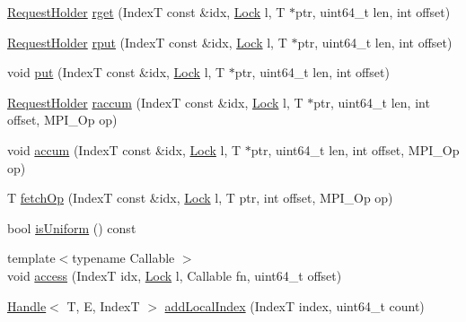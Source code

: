 \begin{DoxyCompactItemize}
\item 
\hyperlink{structvt_1_1rdma_1_1_request_holder}{Request\+Holder} \hyperlink{structvt_1_1rdma_1_1_sub_handle_a574e1878028cc096e008f815fd0b3db6}{rget} (IndexT const \&idx, \hyperlink{namespacevt_1_1rdma_ac5c20b41a653e520b6305d4d454ecb70}{Lock} l, T $\ast$ptr, uint64\+\_\+t len, int offset)
\item 
\hyperlink{structvt_1_1rdma_1_1_request_holder}{Request\+Holder} \hyperlink{structvt_1_1rdma_1_1_sub_handle_a6d0b89af8d8a7f68d7b5a44d724e4364}{rput} (IndexT const \&idx, \hyperlink{namespacevt_1_1rdma_ac5c20b41a653e520b6305d4d454ecb70}{Lock} l, T $\ast$ptr, uint64\+\_\+t len, int offset)
\item 
void \hyperlink{structvt_1_1rdma_1_1_sub_handle_a2e485242951ffe40f56dade64719c423}{put} (IndexT const \&idx, \hyperlink{namespacevt_1_1rdma_ac5c20b41a653e520b6305d4d454ecb70}{Lock} l, T $\ast$ptr, uint64\+\_\+t len, int offset)
\item 
\hyperlink{structvt_1_1rdma_1_1_request_holder}{Request\+Holder} \hyperlink{structvt_1_1rdma_1_1_sub_handle_a83e0f67ca1cbbaeb729c5a4871548023}{raccum} (IndexT const \&idx, \hyperlink{namespacevt_1_1rdma_ac5c20b41a653e520b6305d4d454ecb70}{Lock} l, T $\ast$ptr, uint64\+\_\+t len, int offset, M\+P\+I\+\_\+\+Op op)
\item 
void \hyperlink{structvt_1_1rdma_1_1_sub_handle_ade8b9a06b32efd7533a4f626374cc6eb}{accum} (IndexT const \&idx, \hyperlink{namespacevt_1_1rdma_ac5c20b41a653e520b6305d4d454ecb70}{Lock} l, T $\ast$ptr, uint64\+\_\+t len, int offset, M\+P\+I\+\_\+\+Op op)
\item 
T \hyperlink{structvt_1_1rdma_1_1_sub_handle_aeb76a6664bacfc5ee129866923412c5c}{fetch\+Op} (IndexT const \&idx, \hyperlink{namespacevt_1_1rdma_ac5c20b41a653e520b6305d4d454ecb70}{Lock} l, T ptr, int offset, M\+P\+I\+\_\+\+Op op)
\item 
bool \hyperlink{structvt_1_1rdma_1_1_sub_handle_a8c6c6c237a31ecd12ec9fa5e875b20a7}{is\+Uniform} () const
\item 
{\footnotesize template$<$typename Callable $>$ }\\void \hyperlink{structvt_1_1rdma_1_1_sub_handle_a9773a9d0641613d9ebe10c4a93befd4b}{access} (IndexT idx, \hyperlink{namespacevt_1_1rdma_ac5c20b41a653e520b6305d4d454ecb70}{Lock} l, Callable fn, uint64\+\_\+t offset)
\item 
\hyperlink{structvt_1_1rdma_1_1_handle}{Handle}$<$ T, E, IndexT $>$ \hyperlink{structvt_1_1rdma_1_1_sub_handle_a24f366ba0fe9d2228d82a2c766bdbf45}{add\+Local\+Index} (IndexT index, uint64\+\_\+t count)

\end{DoxyCompactItemize}
